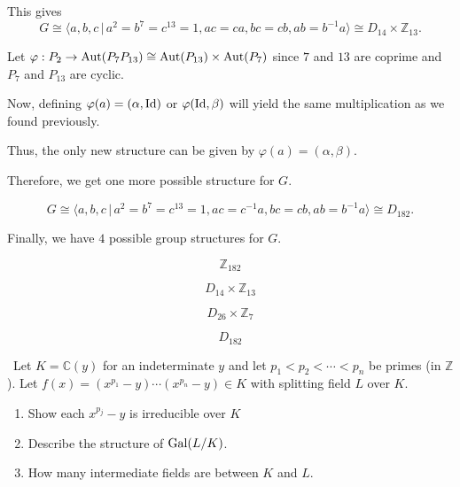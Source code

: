 \documentclass[12pt]{Qual}
\begin{document}
\begin{solution}
This gives $$G\cong\langle a,b,c\,|\,a^2=b^7=c^{13}=1,ac=ca,bc=cb,ab=b^{-1}a\rangle\cong D_{14}\times\mathbb{Z}_{13}.$$

 Let $\varphi:P_2\to\text{Aut}(P_7P_{13})\cong\text{Aut}(P_{13})\times\text{Aut}(P_7)$ since $7$ and $13$ are coprime and $P_7$ and $P_{13}$ are cyclic.

Now, defining $\varphi(a)=(\alpha,\text{Id})$ or $\varphi(\text{Id},\beta)$ will yield the same multiplication as we found previously.

Thus, the only new structure can be given by $\varphi(a)=(\alpha,\beta)$.

Therefore, we get one more possible structure for $G.$

$$G\cong\langle a,b,c\,|\,a^2=b^7=c^{13}=1,ac=c^{-1}a,bc=cb,ab=b^{-1}a\rangle\cong D_{182}.$$

Finally, we have $4$ possible group structures for $G.$

\begin{center}
    \begin{framed}
    $$\mathbb{Z}_{182}$$

    $$D_{14}\times\mathbb{Z}_{13}$$

    $$D_{26}\times\mathbb{Z}_7$$

    $$D_{182}$$
    \end{framed}
\end{center}
\end{solution}
\newpage


\begin{problem} $\,$
Let $K=\mathbb{C}(y)$ for an indeterminate $y$ and let $p_1<p_2<\cdots<p_n$ be primes (in $\mathbb{Z}$). Let $f(x)=(x^{p_1}-y)\cdots(x^{p_n}-y)\in K$ with splitting field $L$ over $K$.
\begin{enumerate}[label=(\alph*)]
    \item Show each $x^{p_j}-y$ is irreducible over $K$
    \item Describe the structure of $\text{Gal}(L/K)$.
    \item How many intermediate fields are between $K$ and $L$.
\end{enumerate}
\end{problem}
\end{document}

